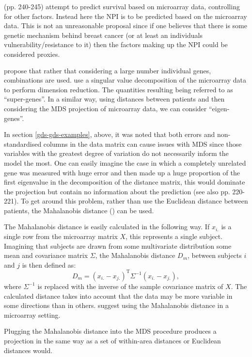 \cite{ernstbook} (pp. 240-245) attempt to predict survival based on microarray data, controlling for other factors. Instead here the NPI is to be predicted based on the microarray data. This is not an unreasonable proposal since if one believes that there is some genetic mechanism behind breast cancer (or at least an individuals vulnerability/resistance to it) then the factors making up the NPI could be considered proxies. 

\cite{spang2002} propose that rather that considering a large number individual genes, combinations are used. \cite{spang2002} use a singular value decomposition of the microarray data to perform dimension reduction. The quantities resulting being referred to as ``super-genes''. In a similar way, using distances between patients and then considering the MDS projection of microarray data, we can consider ``eigen-genes''.

In section \ref{gds-gds-examples}, above, it was noted that both errors and non-standardised columns in the data matrix can cause issues with MDS since those variables with the greatest degree of variation do not necessarily inform the model the most. One can easily imagine the case in which a completely unrelated gene was measured with huge error and then made up a huge proportion of the first eigenvalue in the decomposition of the distance matrix, this would dominate the projection but contain no information about the prediction (see also \cite{ernstbook} pp. 220-221). To get around this problem, rather than use the Euclidean distance between patients, the Mahalanobis distance (\cite{mahalanobis}) can be used.

The Mahalanobis distance is easily calculated in the following way. If $x_{i.}$ is a single row from the microarray matrix $X$, this represents a single subject. Imagining that subjects are drawn from some multivariate distribution some mean and covariance matrix $\Sigma$, the Mahalanobis distance $D_m$, between subjects $i$ and $j$ is then defined as:
\begin{equation}
D_m = (x_{i.} - x_{j.})^\text{T} \Sigma^{-1} (x_{i.} - x_{j.}),
\end{equation}
where $\Sigma^{-1}$ is replaced with the inverse of the sample covariance matrix of $X$. The calculated distance takes into account that the data may be more variable in some directions than in others. \cite{gentleman2005} suggest using the Mahalanobis distance in a microarray setting.

Plugging the Mahalanobis distance into the MDS procedure produces a projection in the same way as a set of within-area distances or Euclidean distances would.

